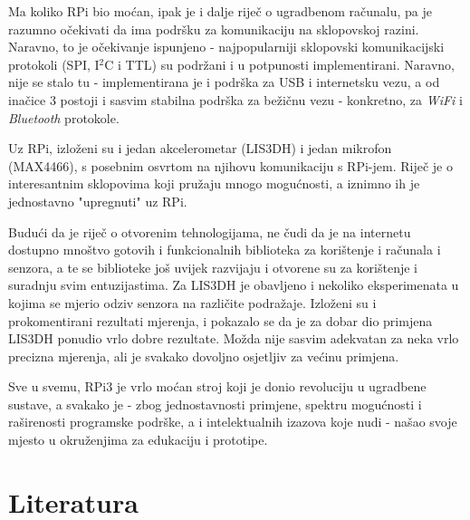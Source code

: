 \documentclass[12pt,a4paper]{article}
\begin{document}
	\par Ma koliko RPi bio moćan, ipak je i dalje riječ o ugradbenom računalu, pa je razumno očekivati da ima podršku za komunikaciju na sklopovskoj razini. Naravno, to je očekivanje ispunjeno - najpopularniji sklopovski komunikacijski protokoli (SPI, I$^2$C i TTL) su podržani i u potpunosti implementirani. Naravno, nije se stalo tu - implementirana je i podrška za USB i internetsku vezu, a od inačice 3 postoji i sasvim stabilna podrška za bežičnu vezu - konkretno, za \textit{WiFi} i \textit{Bluetooth} protokole. \\

	\par Uz RPi, izloženi su i jedan akcelerometar (LIS3DH) i jedan mikrofon (MAX4466), s posebnim osvrtom na njihovu komunikaciju s RPi-jem. Riječ je o interesantnim sklopovima koji pružaju mnogo mogućnosti, a iznimno ih je jednostavno "upregnuti" uz RPi. \\

	\par Budući da je riječ o otvorenim tehnologijama, ne čudi da je na internetu dostupno mnoštvo gotovih i funkcionalnih biblioteka za korištenje i računala i senzora, a te se biblioteke još uvijek razvijaju i otvorene su za korištenje i suradnju svim entuzijastima. Za LIS3DH je obavljeno i nekoliko eksperimenata u kojima se mjerio odziv senzora na različite podražaje. Izloženi su i prokomentirani rezultati mjerenja, i pokazalo se da je za dobar dio primjena LIS3DH ponudio vrlo dobre rezultate. Možda nije sasvim adekvatan za neka vrlo precizna mjerenja, ali je svakako dovoljno osjetljiv za većinu primjena. \\

	\par Sve u svemu, RPi3 je vrlo moćan stroj koji je donio revoluciju u ugradbene sustave, a svakako je - zbog jednostavnosti primjene, spektru mogućnosti i raširenosti programske podrške, a i intelektualnih izazova koje nudi - našao svoje mjesto u okruženjima za edukaciju i prototipe.


\newpage
\section{Literatura}


\printbibliography
\end{document}
